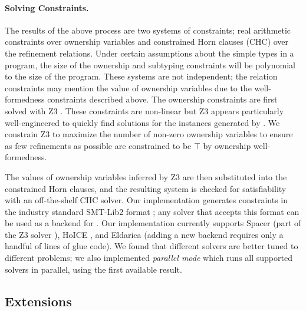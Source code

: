 \paragraph{Solving Constraints.}
The results of the above process are two systems of constraints;
real arithmetic constraints over
ownership variables and constrained Horn clauses (CHC) over the refinement relations.
Under certain assumptions about the simple types in a program, the size of the ownership
and subtyping constraints will be polynomial to the size of the program.
These systems are not independent; the relation constraints may mention the value
of ownership variables due to the well-formedness constraints described above.
The ownership constraints are first solved with Z3 \cite{de2008z3}. These constraints
are non-linear but Z3 appears
particularly well-engineered to quickly find solutions for the instances generated
by \name.
We constrain Z3 to maximize the number of non-zero ownership
variables to ensure as few refinements as possible are constrained to be $ \top $ by ownership well-formedness.

The values of ownership variables inferred by Z3 are then substituted into the
constrained Horn clauses, and the resulting system is checked
for satisfiability with an off-the-shelf CHC solver.
Our implementation generates constraints in the industry standard
SMT-Lib2 format \cite{BarFT-SMTLIB}; any solver that accepts
this format can be used as a backend for \name. Our implementation
currently supports Spacer \cite{komuravelli2013automatic} (part of the Z3 solver \cite{de2008z3}),
HoICE \cite{champion2018hoice}, and Eldarica \cite{rummer2013disjunctive}
(adding a new backend requires only a handful of lines of glue code).
We found that different solvers are better tuned to different problems;
we also implemented \emph{parallel mode} which runs all supported solvers
in parallel, using the first available result.

\subsection{Extensions}

